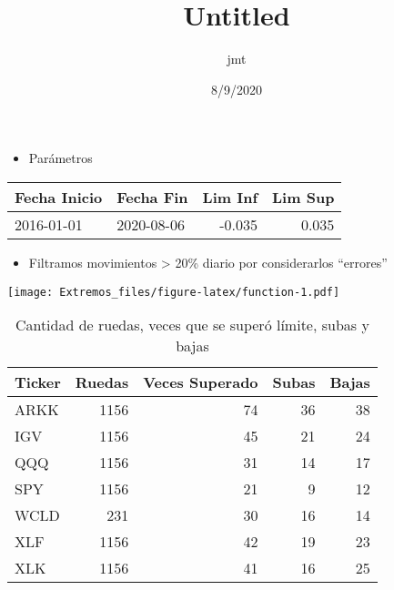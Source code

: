 \documentclass[
]{article}
\title{Untitled}
\author{jmt}
\date{8/9/2020}
\providecommand{\tightlist}{%
  \setlength{\itemsep}{0pt}\setlength{\parskip}{0pt}}
\begin{document}
\maketitle

\begin{itemize}
\tightlist
\item
  Parámetros 
\end{itemize}

\begin{table}[H]
\centering
\begin{tabular}{l|l|r|r}
\hline
Fecha Inicio & Fecha Fin & Lim Inf & Lim Sup\\
\hline
2016-01-01 & 2020-08-06 & -0.035 & 0.035\\
\hline
\end{tabular}
\end{table}

\begin{itemize}
\tightlist
\item
  Filtramos movimientos \textgreater{} 20\% diario por considerarlos
  ``errores''
\end{itemize}

\texttt{[image: Extremos\_files/figure-latex/function-1.pdf]}

\begin{table}

\caption{\label{tab:function2}Cantidad de ruedas, veces que se superó límite, subas y bajas}
\centering
\begin{tabular}[t]{l|r|r|r|r}
\hline
Ticker & Ruedas & Veces Superado & Subas & Bajas\\
\hline
ARKK & 1156 & 74 & 36 & 38\\
\hline
IGV & 1156 & 45 & 21 & 24\\
\hline
QQQ & 1156 & 31 & 14 & 17\\
\hline
SPY & 1156 & 21 & 9 & 12\\
\hline
WCLD & 231 & 30 & 16 & 14\\
\hline
XLF & 1156 & 42 & 19 & 23\\
\hline
XLK & 1156 & 41 & 16 & 25\\
\hline
\end{tabular}
\end{table}
\end{document}
